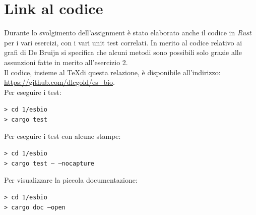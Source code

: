 \documentclass[a4paper,12pt, oneside]{book}
\begin{document}
\chapter{Link al codice}
Durante lo svolgimento dell'assignment è stato elaborato anche il codice in
\textit{Rust} per i vari esercizi, con i vari unit test correlati. In merito al
codice relativo ai grafi di De Bruijn si specifica che alcuni metodi sono
possibili solo grazie alle assunzioni fatte in merito all'esercizio 2.\\
Il codice, insieme al \TeX  di questa relazione, è disponibile all'indirizzo:
\url{https://github.com/dlcgold/es_bio}.\\
Per eseguire i test:
\begin{shaded}
  \noindent
  \texttt{> cd 1/esbio}\\
  \texttt{> cargo test}
\end{shaded}
\noindent
Per eseguire i test con alcune stampe:
\begin{shaded}
  \noindent
  \texttt{> cd 1/esbio}\\
  \texttt{> cargo test -- --nocapture}
\end{shaded}
\noindent
Per visualizzare la piccola documentazione:
\begin{shaded}
  \noindent
  \texttt{> cd 1/esbio}\\
  \texttt{> cargo doc --open}
\end{shaded}
\end{document}
